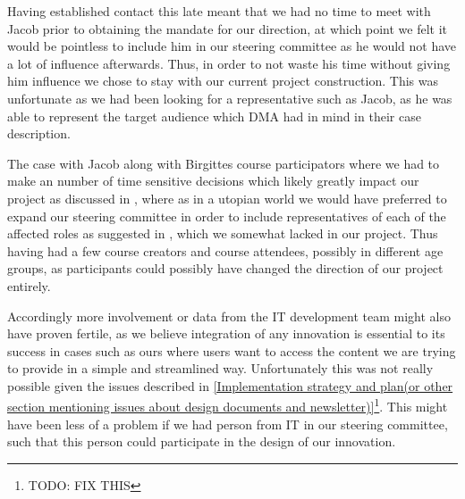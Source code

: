 Having established contact this late meant that we had no time to meet with Jacob prior to obtaining the mandate for our direction, at which point we felt it would be pointless to include him in our steering committee as he would not have a lot of influence afterwards. Thus, in order to not waste his time without giving him influence we chose to stay with our current project construction. This was unfortunate as we had been looking for a representative such as Jacob, as he was able to represent the target audience which DMA had in mind in their case description.

The case with Jacob along with Birgittes course participators where we had to make an number of time sensitive decisions which likely greatly impact our project as discussed in \cite{key-to-success-p1}, where as in a utopian world we would have preferred to expand our steering committee in order to include representatives of each of the affected roles as suggested in \cite{callon}, which we somewhat lacked in our project. Thus having had a few course creators and course attendees, possibly in different age groups, as participants could possibly have changed the direction of our project entirely.

Accordingly more involvement or data from the IT development team might also have proven fertile, as we believe integration of any innovation is essential to its success in cases such as ours where users want to access the content we are trying to provide in a simple and streamlined way. Unfortunately this was not really possible given the issues described in \ref{Implementation strategy and plan(or other section mentioning issues about design documents and newsletter)}\footnote{TODO: FIX THIS}. This might have been less of a problem if we had person from IT in our steering committee, such that this person could participate in the design of our innovation.